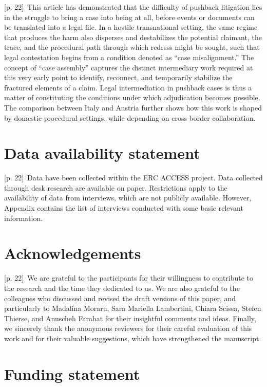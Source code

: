 \documentclass[10pt,a4paper]{article}
\begin{document}
{\scriptsize\color{gray} [p. 22]}\ This article has demonstrated that the difficulty of pushback litigation lies in the struggle to bring a case into being at all, before events or documents can be translated into a legal file. In a hostile transnational setting, the same regime that produces the harm also disperses and destabilizes the potential claimant, the trace, and the procedural path through which redress might be sought, such that legal contestation begins from a condition denoted as “case misalignment.” The concept of “case assembly” captures the distinct intermediary work required at this very early point to identify, reconnect, and temporarily stabilize the fractured elements of a claim. Legal intermediation in pushback cases is thus a matter of constituting the conditions under which adjudication becomes possible. The comparison between Italy and Austria further shows how this work is shaped by domestic procedural settings, while depending on cross-border collaboration.\par
{}\section*{Data availability statement}
{\scriptsize\color{gray} [p. 22]}\ Data have been collected within the ERC ACCESS project. Data collected through desk research are available on paper. Restrictions apply to the availability of data from interviews, which are not publicly available. However, Appendix contains the list of interviews conducted with some basic relevant information.\par
{}\section*{Acknowledgements}
{\scriptsize\color{gray} [p. 22]}\ We are grateful to the participants for their willingness to contribute to the research and the time they dedicated to us. We are also grateful to the colleagues who discussed and revised the draft versions of this paper, and particularly to Madalina Moraru, Sara Mariella Lambertini, Chiara Scissa, Stefen Thierse, and Anuscheh Farahat for their insightful comments and ideas. Finally, we sincerely thank the anonymous reviewers for their careful evaluation of this work and for their valuable suggestions, which have strengthened the manuscript.\par
{}\section*{Funding statement}
\end{document}
